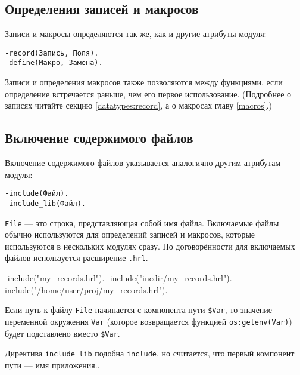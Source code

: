 \subsection{Определения записей и макросов}

Записи и макросы определяются так же, как и другие атрибуты модуля:

\begin{verbatim}
-record(Запись, Поля).
-define(Макро, Замена).
\end{verbatim}

Записи и определения макросов также позволяются между функциями, если определение
встречается раньше, чем его первое использование. (Подробнее о записях читайте 
секцию \ref{datatypes:record}, а о макросах главу \ref{macros}.)



\subsection{Включение содержимого файлов}

Включение содержимого файлов указывается аналогично другим атрибутам модуля:

\begin{verbatim}
-include(Файл).
-include_lib(Файл).
\end{verbatim}

\texttt{File} --- это строка, представляющая собой имя файла. Включаемые файлы 
обычно используются для определений записей и макросов, которые используются
в нескольких модулях сразу. По договорённости для включаемых файлов используется
расширение \texttt{.hrl}.

\begin{erlang}
-include("my_records.hrl").
-include("incdir/my_records.hrl").
-include("/home/user/proj/my_records.hrl").
\end{erlang}

Если путь к файлу \texttt{File} начинается с компонента пути \texttt{\$Var}, то
значение переменной окружения \texttt{Var} (которое возвращается функцией
\texttt{os:getenv(Var)}) будет подставлено вместо \texttt{\$Var}.


Директива \texttt{include\_lib} подобна \texttt{include}, но считается, что 
первый компонент пути --- имя приложения..

